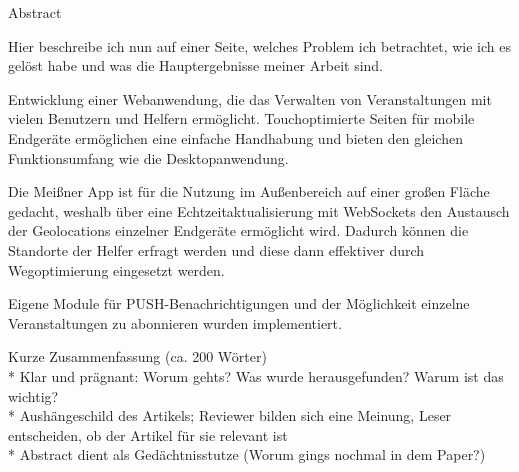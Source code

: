 \begin{center} 
\huge Abstract
\end{center}

Hier beschreibe ich nun auf einer Seite, welches Problem ich betrachtet, wie ich es gelöst habe
und was die Hauptergebnisse meiner Arbeit sind.

Entwicklung einer Webanwendung, die das Verwalten von Veranstaltungen mit vielen Benutzern und Helfern ermöglicht. Touchoptimierte Seiten für mobile Endgeräte ermöglichen eine einfache Handhabung und bieten den gleichen Funktionsumfang wie die Desktopanwendung.\par

Die Meißner App ist für die Nutzung im Außenbereich auf einer großen Fläche gedacht, weshalb über eine Echtzeitaktualisierung mit WebSockets den Austausch der Geolocations einzelner Endgeräte ermöglicht wird. Dadurch können die Standorte der Helfer erfragt werden und diese dann effektiver durch Wegoptimierung eingesetzt werden.\par

Eigene Module für PUSH-Benachrichtigungen und der Möglichkeit einzelne Veranstaltungen zu abonnieren wurden implementiert. 

Kurze Zusammenfassung (ca. 200 Wörter)\\
* Klar und prägnant: Worum gehts? Was wurde herausgefunden? Warum ist das wichtig?\\
* Aushängeschild des Artikels; Reviewer bilden sich eine Meinung, Leser entscheiden, ob der Artikel für sie relevant ist\\
* Abstract dient als Gedächtnisstutze (Worum gings nochmal in dem Paper?)

